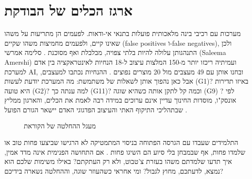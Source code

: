 \section{ארגז הכלים של הבודקת}
מערכות עם רכיבי בינה מלאכותית פועלות בתנאי אי-ודאות. לפעמים הן מתריעות על משהו שאינו קיים, ולפעמים מחמיצות משהו שקיים (false positives ו-false negatives), ולכן התנהגותן עלולה להיות בלתי צפויה, מבלבלת ואף מסוכנת \cite{S-ch07-06}. סלימה אמרשי (Saleema Amershi) ועמיתיה ריכזו יותר מ-150 המלצות עיצוב ל-18 הנחיות לאינטראקציה בין אדם למערכת AI, ובחנו אותן עם 49 מעצבים מול 20 מוצרים נפוצים \cite{S-ch07-05,S-ch07-06}. ההנחיות נכתבו למעצבים, אבל כאן נהפוך אותן לשאלות של משתמשת: מה המערכת יודעת לעשות (G1)? באיזו תדירות היא טועה (G2)? למה ענתה כך (G11)? וכמה קל לתקן אותה כשהיא שוגה (G9) \cite{S-ch07-06}?
לפי אונסק"ו, מוסדות החינוך עדיין אינם ערוכים במידה רבה לאמת את הכלים, והארגון ממליץ שבתהליכי התיקוף האתי והעיצוב הפדגוגי האדם יישאר הגורם הפועל \cite{S-ch07-07}.
\begin{figure}[htbp]
\centering

\caption{מעגל ההחלטה של הקוראת}\label{fig:7.1}
\end{figure}
\begin{thinkbox}
התלמידים שעבדו עם הגרסה הפתוחה בניסוי המתמטיקה לא הרגישו שביצעו פחות טוב או שלמדו פחות, אף שבמבחן בלי סיוע הם השיגו פחות \cite{S-ch07-10}. אם התחושה הפנימית אינה מדד אמין, איך תדעו שלמדתם משהו בעזרת צ'טבוט, ולא רק העתקתם? באילו משימות שלכם הוא נמצא, לדעתכם, מחוץ לגבול? ומי אחראי כשהעוזר שוגה, וההחלטה נשארה בידיכם?
\end{thinkbox}
